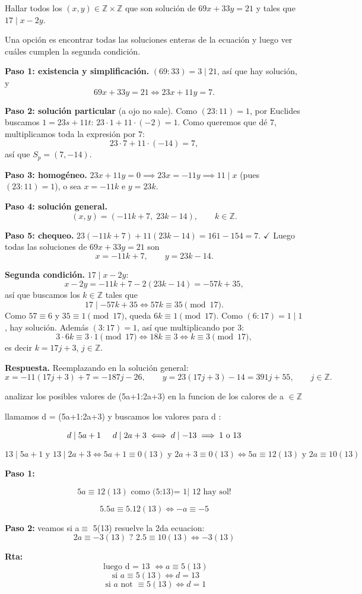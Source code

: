 \begin{ejemplo}
Hallar todos los $(x,y)\in\mathbb{Z}\times\mathbb{Z}$ que son solución de
$69x+33y=21$ y tales que $17\mid x-2y$.

Una opción es encontrar todas las soluciones enteras de la ecuación y luego ver
cuáles cumplen la segunda condición.

\textbf{Paso 1: existencia y simplificación.} $(69:33)=3\mid 21$, así que hay
solución, y
\[
69x+33y=21 \iff 23x+11y=7.
\]

\textbf{Paso 2: solución particular} (a ojo no sale). Como $(23:11)=1$, por
Euclides buscamos $1=23s+11t$: $23\cdot 1+11\cdot(-2)=1$. Como queremos que dé
$7$, multiplicamos toda la expresión por $7$:
\[
23\cdot 7+11\cdot(-14)=7,
\]
así que $S_p=(7,-14)$.

\textbf{Paso 3: homogéneo.} $23x+11y=0 \implies 23x=-11y \implies 11\mid x$
(pues $(23:11)=1$), o sea $x=-11k$ e $y=23k$.

\textbf{Paso 4: solución general.}
\[
(x,y)=(-11k+7,\;23k-14), \qquad k\in\mathbb{Z}.
\]

\textbf{Paso 5: chequeo.} $23(-11k+7)+11(23k-14)=161-154=7$. $\checkmark$
Luego todas las soluciones de $69x+33y=21$ son
\[
x=-11k+7, \qquad y=23k-14.
\]

\textbf{Segunda condición.} $17\mid x-2y$:
\[
x-2y=-11k+7-2(23k-14)=-57k+35,
\]
así que buscamos los $k\in\mathbb{Z}$ tales que
\[
17\mid -57k+35 \iff 57k\equiv 35 \pmod{17}.
\]
Como $57\equiv 6$ y $35\equiv 1 \pmod{17}$, queda $6k\equiv 1 \pmod{17}$.
Como $(6:17)=1\mid 1$, hay solución. Además $(3:17)=1$, así que multiplicando por $3$:
\[
3\cdot 6k\equiv 3\cdot 1 \pmod{17} \iff 18k\equiv 3 \iff k\equiv 3 \pmod{17},
\]
es decir $k=17j+3$, $j\in\mathbb{Z}$.

\textbf{Respuesta.} Reemplazando en la solución general:
\[
x=-11(17j+3)+7=-187j-26, \qquad y=23(17j+3)-14=391j+55, \qquad j\in\mathbb{Z}.
\]
\end{ejemplo}

\begin{ejemplo}
analizar los posibles valores de (5a+1:2a+3) en la funcion de los calores de a $\in \mathbb{Z}$

llamamos d = (5a+1:2a+3) y buscamos los valores para d : 

\[
d \mid 5a+1 \hspace{0.5cm} d\mid 2a+3 \iff d\mid -13  \implies 1 \text{ o } 13
\]

\[
13 \mid 5a+1 \text{  y  } 13 \mid 2a+3  \iff 5a+1 \equiv 0 (13) \text{  y  } 2a+3 \equiv 0 (13) \iff 5a\equiv 12 (13) \text{  y  } 2a \equiv 10 (13)
\]

\textbf{Paso 1:}

\[
5a \equiv 12(13) \text{  como (5:13)= 1| 12 hay sol!}
\]

\[
5.5 a \equiv  5.12 (13) \iff -a \equiv -5
\]

\textbf{Paso 2:}
veamos si a$\equiv$ 5(13) resuelve la 2da ecuacion:
\[
2a \equiv -3(13) \text{ ? } 2.5 \equiv 10 (13) \iff -3(13)
\]

\textbf{Rta:}
\[
\text{ luego d = 13 }\iff a \equiv 5(13)  
\]
\[
\text{ si } a \equiv 5 (13) \iff d = 13  
\]
\[
\text{ si } a \text{ not } \equiv 5 (13) \iff d = 1  
\]


\end{ejemplo}